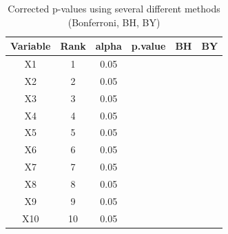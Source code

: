 \documentclass[]{book}
\begin{document}
\begin{table}[t]

\caption{\label{tab:BYexample}Corrected p-values using several different methods (Bonferroni, BH, BY)}
\centering
\begin{tabular}{cccccc}
\toprule
Variable & Rank & alpha & p.value & BH & BY\\
\midrule
\rowcolor{gray!6}  X1 & 1 & 0.05 & \cellcolor[HTML]{3399FF}{\textcolor{black}{0.002}} & \cellcolor[HTML]{00FF00}{\textcolor{black}{0.005}} & \cellcolor[HTML]{FF0000}{\textcolor{black}{0.005}}\\
X2 & 2 & 0.05 & \cellcolor[HTML]{3399FF}{\textcolor{black}{0.004}} & \cellcolor[HTML]{00FF00}{\textcolor{black}{0.01}} & \cellcolor[HTML]{FF0000}{\textcolor{black}{0.007}}\\
\rowcolor{gray!6}  X3 & 3 & 0.05 & \cellcolor[HTML]{FFFFFF}{\textcolor{black}{0.008}} & \cellcolor[HTML]{00FF00}{\textcolor{black}{0.015}} & \cellcolor[HTML]{FF0000}{\textcolor{black}{0.008}}\\
X4 & 4 & 0.05 & \cellcolor[HTML]{FFFFFF}{\textcolor{black}{0.012}} & \cellcolor[HTML]{00FF00}{\textcolor{black}{0.02}} & \cellcolor[HTML]{FFFFFF}{\textcolor{black}{0.01}}\\
\rowcolor{gray!6}  X5 & 5 & 0.05 & \cellcolor[HTML]{FFFFFF}{\textcolor{black}{0.023}} & \cellcolor[HTML]{FFFFFF}{\textcolor{black}{0.025}} & \cellcolor[HTML]{FFFFFF}{\textcolor{black}{0.011}}\\
\addlinespace
X6 & 6 & 0.05 & \cellcolor[HTML]{FFFFFF}{\textcolor{black}{0.041}} & \cellcolor[HTML]{FFFFFF}{\textcolor{black}{0.03}} & \cellcolor[HTML]{FFFFFF}{\textcolor{black}{0.012}}\\
\rowcolor{gray!6}  X7 & 7 & 0.05 & \cellcolor[HTML]{FFFFFF}{\textcolor{black}{0.054}} & \cellcolor[HTML]{FFFFFF}{\textcolor{black}{0.035}} & \cellcolor[HTML]{FFFFFF}{\textcolor{black}{0.013}}\\
X8 & 8 & 0.05 & \cellcolor[HTML]{FFFFFF}{\textcolor{black}{0.091}} & \cellcolor[HTML]{FFFFFF}{\textcolor{black}{0.04}} & \cellcolor[HTML]{FFFFFF}{\textcolor{black}{0.015}}\\
\rowcolor{gray!6}  X9 & 9 & 0.05 & \cellcolor[HTML]{FFFFFF}{\textcolor{black}{0.12}} & \cellcolor[HTML]{FFFFFF}{\textcolor{black}{0.045}} & \cellcolor[HTML]{FFFFFF}{\textcolor{black}{0.016}}\\
X10 & 10 & 0.05 & \cellcolor[HTML]{FFFFFF}{\textcolor{black}{0.2}} & \cellcolor[HTML]{FFFFFF}{\textcolor{black}{0.05}} & \cellcolor[HTML]{FFFFFF}{\textcolor{black}{0.017}}\\
\bottomrule
\end{tabular}
\end{table}
\end{document}
